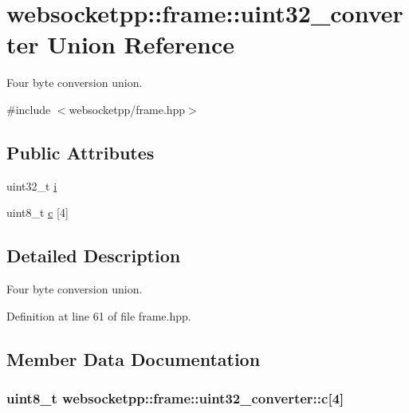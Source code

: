 \hypertarget{unionwebsocketpp_1_1frame_1_1uint32__converter}{}\section{websocketpp\+:\+:frame\+:\+:uint32\+\_\+converter Union Reference}
\label{unionwebsocketpp_1_1frame_1_1uint32__converter}


Four byte conversion union.  




{\ttfamily \#include $<$websocketpp/frame.\+hpp$>$}

\subsection*{Public Attributes}
\begin{DoxyCompactItemize}
\item 
uint32\+\_\+t \hyperlink{unionwebsocketpp_1_1frame_1_1uint32__converter_a2bceb785be148d7c9b9ce11240595440}{i}
\item 
uint8\+\_\+t \hyperlink{unionwebsocketpp_1_1frame_1_1uint32__converter_ad7e9db5dd4002d78e9aaf624d39fd69c}{c} \mbox{[}4\mbox{]}
\end{DoxyCompactItemize}


\subsection{Detailed Description}
Four byte conversion union. 

Definition at line 61 of file frame.\+hpp.



\subsection{Member Data Documentation}
\hypertarget{unionwebsocketpp_1_1frame_1_1uint32__converter_ad7e9db5dd4002d78e9aaf624d39fd69c}{}
\subsubsection[{c}]{\setlength{\rightskip}{0pt plus 5cm}uint8\+\_\+t websocketpp\+::frame\+::uint32\+\_\+converter\+::c\mbox{[}4\mbox{]}}\label{unionwebsocketpp_1_1frame_1_1uint32__converter_ad7e9db5dd4002d78e9aaf624d39fd69c}


